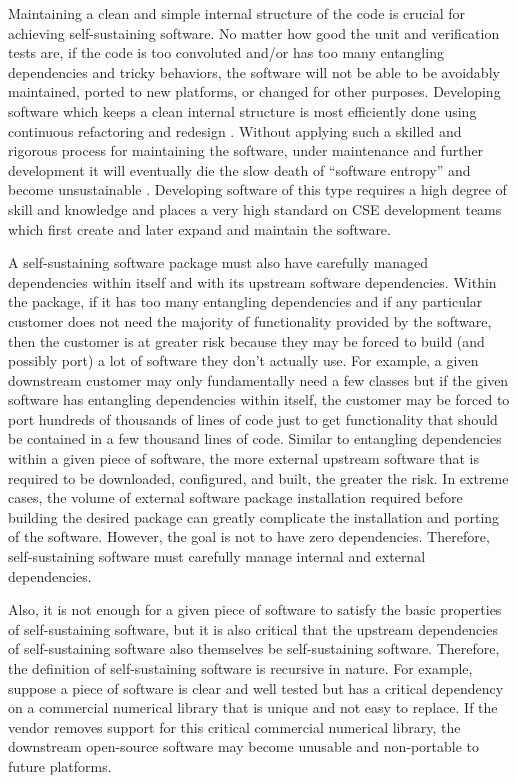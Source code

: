 \documentclass[11pt]{SANDreport}
\begin{document}
Maintaining a clean and simple internal structure of the code is
crucial for achieving self-sustaining software.  No matter how good
the unit and verification tests are, if the code is too convoluted
and/or has too many entangling dependencies and tricky behaviors, the
software will not be able to be avoidably maintained, ported to new
platforms, or changed for other purposes.  Developing software which
keeps a clean internal structure is most efficiently done using
continuous refactoring and redesign {}\cite{XP2}.  Without applying
such a skilled and rigorous process for maintaining the software,
under maintenance and further development it will eventually die the
slow death of ``software entropy'' and become unsustainable
{}\cite{MythicalManMonth95}.  Developing software of this type
requires a high degree of skill and knowledge and places a very high
standard on CSE development teams which first create and later expand
and maintain the software.

A self-sustaining software package must also have carefully managed
dependencies within itself and with its upstream software
dependencies.  Within the package, if it has too many entangling
dependencies and if any particular customer does not need the majority
of functionality provided by the software, then the customer is at
greater risk because they may be forced to build (and possibly port) a
lot of software they don't actually use.  For example, a given
downstream customer may only fundamentally need a few classes but if
the given software has entangling dependencies within itself, the
customer may be forced to port hundreds of thousands of lines of code
just to get functionality that should be contained in a few thousand
lines of code.  Similar to entangling dependencies within a given
piece of software, the more external upstream software that is
required to be downloaded, configured, and built, the greater the
risk.  In extreme cases, the volume of external software package
installation required before building the desired package can greatly
complicate the installation and porting of the software.  However, the
goal is not to have zero dependencies.  Therefore, self-sustaining
software must carefully manage internal and external dependencies.

Also, it is not enough for a given piece of software to satisfy the
basic properties of self-sustaining software, but it is also critical
that the upstream dependencies of self-sustaining software also
themselves be self-sustaining software. Therefore, the definition of
self-sustaining software is recursive in nature.  For example, suppose
a piece of software is clear and well tested but has a critical
dependency on a commercial numerical library that is unique and not
easy to replace.  If the vendor removes support for this critical
commercial numerical library, the downstream open-source software may
become unusable and non-portable to future platforms.
\end{document}
